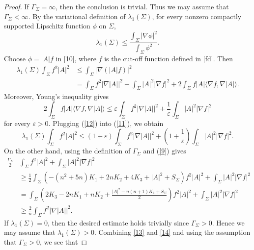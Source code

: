 \documentclass[amssymb,amstex,amsmath,11pt]{article}
\numberwithin{equation}{section}
\renewcommand{\epsilon}{\varepsilon}
\theoremstyle{plain}
\theoremstyle{definition}
\theoremstyle{remark}
\begin{document}
\begin{proof}
If $\Gamma_{\Sigma}=\infty$, then the conclusion is trivial. Thus we may assume that $\Gamma_{\Sigma}<\infty$. By the variational definition of $\lambda_1(\Sigma)$, for every nonzero compactly supported Lipschitz function $\phi$ on $\Sigma$,
    \begin{equation}\label{10}
        \lambda_1(\Sigma) \leq \frac{\int_\Sigma|\nabla \phi|^2}{\int_\Sigma \phi^2}.
    \end{equation}
Choose $\phi=|A|f$ in \eqref{10}, where $f$ is the cut-off function defined in \eqref{fd}. Then
  \begin{align}\label{11}
\lambda_1(\Sigma)\int_\Sigma f^2|A|^2
&\le \int_\Sigma |\nabla (|A|f)|^2 \nonumber\\
&= \int_\Sigma f^2|\nabla |A||^2
 + \int_\Sigma |A|^2|\nabla f|^2
 + 2\int_\Sigma f|A|\langle \nabla f,\nabla |A| \rangle.
\end{align}
Moreover, Young's inequality gives
  \begin{equation}\label{12}
        2\int_\Sigma f|A|\langle \nabla f, \nabla |A|\rangle
        \leq \epsilon\int_\Sigma f^2|\nabla |A||^2 + \frac{1}{\epsilon} \int_\Sigma |A|^2|\nabla f|^2
    \end{equation}
    for every $\epsilon>0$. Plugging (\ref{12}) into (\ref{11}), we obtain
  \begin{equation}\label{13}
\lambda_1(\Sigma)\int_\Sigma f^2|A|^2
\le
\left(1+\epsilon\right)\int_\Sigma f^2|\nabla |A||^2
+ \left(1+\frac{1}{\epsilon}\right)\int_\Sigma |A|^2|\nabla f|^2.
\end{equation}
On the other hand, using the definition of $\Gamma_\Sigma$ and  (\ref{9}) gives
      \begin{align}\label{14}
        \frac{\Gamma_{\Sigma}}{2}&\int_\Sigma f^2|A|^2 + \int_\Sigma |A|^2|\nabla f|^2 \nonumber\\
        &\geq \frac{1}{2}\int_\Sigma(-(n^2+5n)K_1 + 2nK_2 + 4K_3 + |A|^2 + S_{\Sigma}) f^2|A|^2 + \int_\Sigma |A|^2|\nabla f|^2 \nonumber \\
        & = \int_\Sigma\left(2K_3-2nK_1+nK_2+\frac{|A|^2-n(n+1)K_1+S_{\Sigma}}{2}\right) f^2|A|^2 + \int_\Sigma |A|^2|\nabla f|^2 \nonumber\\
        & \geq \frac{2}{n}\int_\Sigma f^2|\nabla |A||^2.
\end{align}
If $\lambda_1(\Sigma)=0$, then the desired estimate holds trivially since $\Gamma_\Sigma>0$. Hence we may assume that $\lambda_1(\Sigma)>0$. Combining \eqref{13} and \eqref{14} and using the assumption that $\Gamma_\Sigma>0$, we see that

\end{proof}
\end{document}

